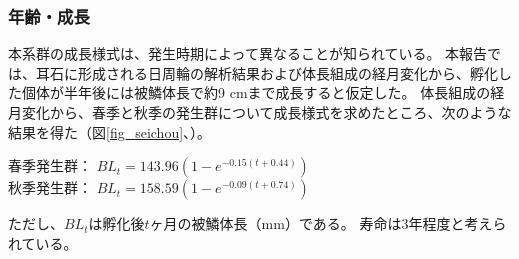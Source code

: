 \subsubsection{年齢・成長}
本系群の成長様式は、発生時期によって異なることが知られている。
本報告では、耳石に形成される日周輪の解析結果および体長組成の経月変化から、孵化した個体が半年後には被鱗体長で約9 cmまで成長すると仮定した。
体長組成の経月変化から、春季と秋季の発生群について成長様式を求めたところ、次のような結果を得た（図\ref{fig_seichou}、\citet{Ohshimo2009}）。

\begin{center}
春季発生群： $BL_t = 143.96(1-e^{-0.15(t+0.44)})$\\
秋季発生群： $BL_t = 158.59(1-e^{-0.09(t+0.74)})$
\end{center}
ただし、$BL_t$は孵化後$t$ヶ月の被鱗体長（mm）である。
寿命は3年程度と考えられている。
